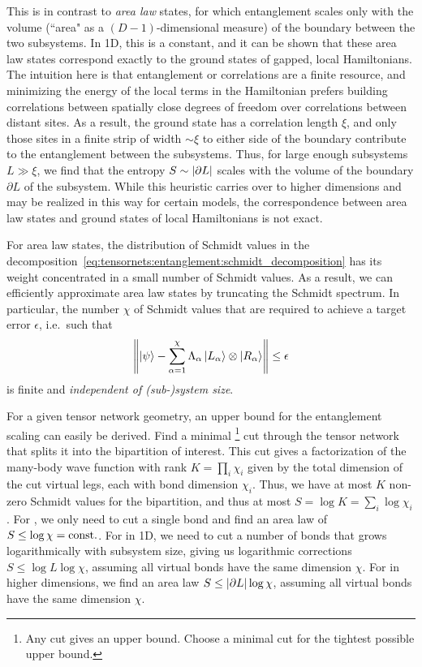 %
This is in contrast to \emph{area law} states, for which entanglement scales only with the volume (``area" as a $(D-1)$-dimensional measure) of the boundary between the two subsystems.
%
In 1D, this is a constant, and it can be shown that these area law states correspond exactly to the ground states of gapped, local Hamiltonians.
%
The intuition here is that entanglement or correlations are a finite resource, and minimizing the energy of the local terms in the Hamiltonian prefers building correlations between spatially close degrees of freedom over correlations between distant sites.
%
As a result, the ground state has a correlation length $\xi$, and only those sites in a finite strip of width $\sim \xi$ to either side of the boundary contribute to the entanglement between the subsystems.
%
Thus, for large enough subsystems $L \gg \xi$, we find that the entropy $S \sim \abs{\partial L}$ scales with the volume of the boundary $\partial L$ of the subsystem.
%
While this heuristic carries over to higher dimensions and may be realized in this way for certain models, the correspondence between area law states and ground states of local Hamiltonians is not exact.

For area law states, the distribution of Schmidt values in the decomposition~\eqref{eq:tensornets:entanglement:schmidt_decomposition} has its weight concentrated in a small number of Schmidt values.
%
As a result, we can efficiently approximate area law states by truncating the Schmidt spectrum.
%
In particular, the number $\chi$ of Schmidt values that are required to achieve a target error $\epsilon$, i.e.~such that
\begin{equation}
    \label{eq:tensornets:entanglement:error_truncated_schmidt_decomp}
    \norm{
        \ket{\psi} - \sum_{\alpha=1}^{\chi} \Lambda_\alpha \ket{L_\alpha} \otimes \ket{R_\alpha}
    } \leq \epsilon
\end{equation}
is finite and \emph{independent of (sub-)system size}.

For a given tensor network geometry, an upper bound for the entanglement scaling can easily be derived.
%
Find a minimal%
    \footnote{
        Any cut gives an upper bound. Choose a minimal cut for the tightest possible upper bound.
    }
cut through the tensor network that splits it into the bipartition of interest.
%
This cut gives a factorization of the many-body wave function with rank $K = \prod_i \chi_i$ given by the total dimension of the cut virtual legs, each with bond dimension $\chi_i$.
%
Thus, we have at most $K$ non-zero Schmidt values for the bipartition, and thus at most $S = \log K = \sum_i \log \chi_i$.
%
For , we only need to cut a single bond and find an area law of $S \leq \log\chi = \mathrm{const.}$.
%
For  in 1D, we need to cut a number of bonds that grows logarithmically with subsystem size, giving us logarithmic corrections $S \leq \log L \log \chi$, assuming all virtual bonds have the same dimension $\chi$.
%
For  in higher dimensions, we find an area law $S \leq \abs{\partial L} \log \chi$, assuming all virtual bonds have the same dimension $\chi$.
%

